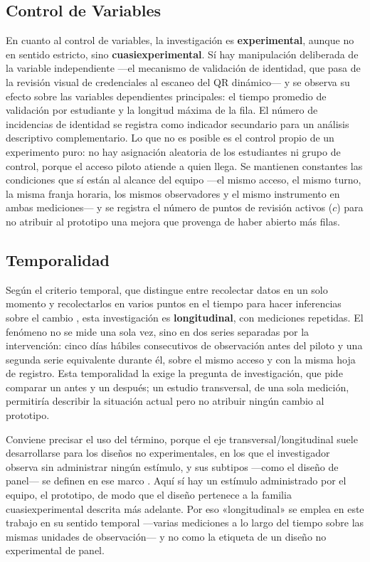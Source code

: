\subsection{Control de Variables}
En cuanto al control de variables, la investigación es \textbf{experimental},
aunque no en sentido estricto, sino \textbf{cuasiexperimental}. Sí hay
manipulación deliberada de la variable independiente —el mecanismo de
validación de identidad, que pasa de la revisión visual de credenciales al
escaneo del QR dinámico— y se observa su efecto sobre las variables
dependientes principales: el tiempo promedio de validación por estudiante y
la longitud máxima de la fila. El número de incidencias de identidad se
registra como indicador secundario para un análisis descriptivo
complementario. Lo que no es
posible es el control propio de un experimento puro: no hay asignación
aleatoria de los estudiantes ni grupo de control, porque el acceso piloto
atiende a quien llega. Se mantienen constantes las condiciones que sí están al
alcance del equipo —el mismo acceso, el mismo turno, la misma franja horaria,
los mismos observadores y el mismo instrumento en ambas mediciones— y se
registra el número de puntos de revisión activos ($c$) para no atribuir al
prototipo una mejora que provenga de haber abierto más filas.

\subsection{Temporalidad}
Según el criterio temporal, que distingue entre recolectar datos en un solo
momento y recolectarlos en varios puntos en el tiempo para hacer inferencias
sobre el cambio \parencite{hernandezsampieri2014metodologia}, esta
investigación es \textbf{longitudinal}, con mediciones repetidas. El fenómeno
no se mide una sola vez, sino en dos series separadas por la intervención:
cinco días hábiles consecutivos de observación antes del piloto y una segunda
serie equivalente durante él, sobre el mismo acceso y con la misma hoja de
registro. Esta temporalidad la exige la pregunta de investigación, que pide
comparar un antes y un después; un estudio transversal, de una sola medición,
permitiría describir la situación actual pero no atribuir ningún cambio al
prototipo.

Conviene precisar el uso del término, porque el eje
transversal/longitudinal suele desarrollarse para los diseños no
experimentales, en los que el investigador observa sin administrar ningún
estímulo, y sus subtipos —como el diseño de panel— se definen en ese marco
\parencite{hernandezsampieri2014metodologia}. Aquí sí hay un estímulo
administrado por el equipo, el prototipo, de modo que el diseño pertenece a la
familia cuasiexperimental descrita más adelante. Por eso «longitudinal» se
emplea en este trabajo en su sentido temporal —varias mediciones a lo largo
del tiempo sobre las mismas unidades de observación— y no como la etiqueta de
un diseño no experimental de panel.

